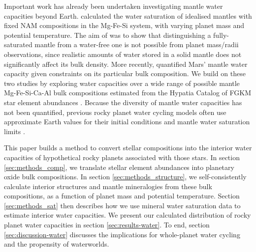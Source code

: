 Important work has already been undertaken investigating mantle water capacities beyond Earth. \citet{shah_internal_2021} calculated the water saturation of idealised mantles with fixed NAM compositions in the Mg-Fe-Si system, with varying planet mass and potential temperature. The aim of \citet{shah_internal_2021} was to show that distinguishing a fully-saturated mantle from a water-free one is not possible from planet mass/radii observations, since realistic amounts of water stored in a solid mantle does not significantly affect its bulk density. More recently, \citet{dong_water_2022} quantified Mars' mantle water capacity given constraints on its particular bulk composition. We build on these two studies by exploring water capacities over a wide range of possible mantle Mg-Fe-Si-Ca-Al bulk compositions estimated from the Hypatia Catalog of FGKM star element abundances \citep{hinkel_stellar_2014}. %
Because the diversity of mantle water capacities has not been quantified, previous rocky planet water cycling models often use approximate Earth values for their initial conditions and mantle water saturation limits \citep[e.g.,][]{cowan_water_2014, schaefer_persistence_2015, komacek_effect_2016, moore_keeping_2020}. %

This paper builds a method to convert stellar compositions into the interior water capacities of hypothetical rocky planets associated with those stars. In section \ref{sec:methods_comp}, we translate stellar element abundances into planetary oxide bulk compositions. In section \ref{sec:methods_structure}, we self-consistently calculate interior structures and mantle mineralogies from these bulk compositions, as a function of planet mass and potential temperature. Section \ref{sec:methods_sat} then describes how we use mineral water saturation data to estimate interior water capacities. We present our calculated distribution of rocky planet water capacities in section \ref{sec:results-water}. To end, section \ref{sec:discussion-water} discusses the implications for whole-planet water cycling and the propensity of waterworlds.   


